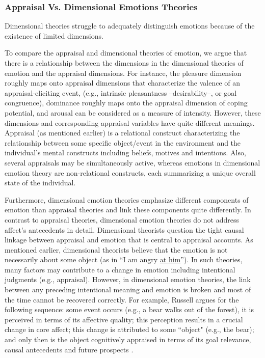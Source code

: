 \documentclass[12pt]{report}
\begin{document}
\subsubsection{Appraisal Vs. Dimensional Emotions Theories}

Dimensional theories struggle to adequately distinguish emotions because of the
existence of limited dimensions.

To compare the appraisal and dimensional theories of emotion, we argue that
there is a relationship between the dimensions in the dimensional theories of
emotion and the appraisal dimensions. For instance, the pleasure dimension
roughly maps onto appraisal dimensions that characterize the valence of an
appraisal-eliciting event, (e.g., intrinsic pleasantness --desirability--, or
goal congruence), dominance roughly maps onto the appraisal dimension of coping
potential, and arousal can be considered as a measure of intensity. However,
these dimensions and corresponding appraisal variables have quite different
meanings. Appraisal (as mentioned earlier) is a relational construct
characterizing the relationship between some specific object/event in the
environment and the individual's mental constructs including beliefs, motives
and intentions. Also, several appraisals may be simultaneously active, whereas
emotions in dimensional emotion theory are non-relational constructs, each
summarizing a unique overall state of the individual.

Furthermore, dimensional emotion theories emphasize different components of
emotion than appraisal theories and link these components quite differently.
In contrast to appraisal theories, dimensional emotion theories do not address
affect's antecedents in detail. Dimensional theorists question the tight causal
linkage between appraisal and emotion that is central to appraisal accounts. As
mentioned earlier, dimensional theorists believe that the emotion is not
necessarily about some object (as in ``I am angry \underline{at him}''). In such
theories, many factors may contribute to a change in emotion including
intentional judgments (e.g., appraisal). However, in dimensional emotion
theories, the link between any preceding intentional meaning and emotion is
broken and most of the time cannot be recovered correctly. For example, Russell
argues for the following sequence: some event occurs (e.g., a bear walks out of
the forest), it is perceived in terms of its affective quality; this perception
results in a crucial change in core affect; this change is attributed to some
``object" (e.g., the bear); and only then is the object cognitively appraised in
terms of its goal relevance, causal antecedents and future prospects
\cite{marsella:computational-models}.
\end{document}
